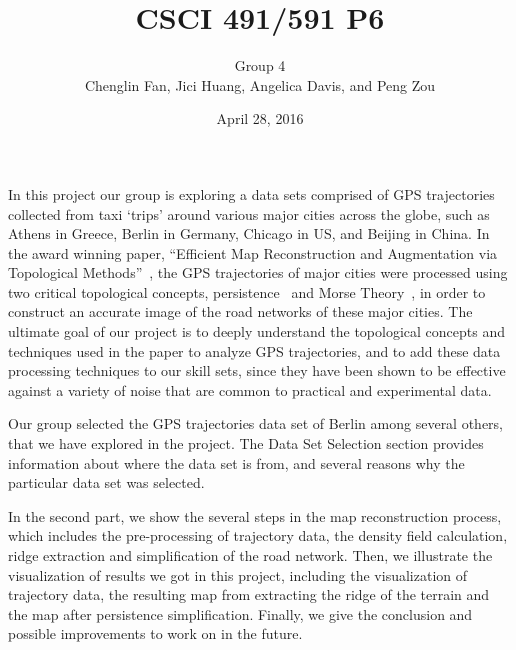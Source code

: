 \documentclass[11pt]{article}
\title{CSCI 491/591 P6}
\date{April 28, 2016}
\author{Group 4\\Chenglin Fan, Jici Huang,
Angelica Davis, and Peng Zou}
\begin{document}
\maketitle
\vspace{-0.4 in}
\noindent


  In this project our group is exploring a data sets comprised of GPS trajectories collected from taxi `trips' around various major cities across the globe, such as Athens in Greece, Berlin in Germany, Chicago in US, and Beijing in China. In the award winning paper, ``Efficient Map Reconstruction and Augmentation via Topological Methods''~\cite{Wang15}, the GPS trajectories of major cities were processed using two critical topological concepts, persistence~\cite{edelsbrunner2008persistent} and Morse Theory~\cite{milnor1963morse}, in order to construct an accurate image of the road networks of these major cities. The ultimate goal of our project is to deeply understand the topological concepts and techniques used in the paper to analyze GPS trajectories, and to add these data processing techniques to our skill sets, since they have been shown to be effective against a variety of noise that are common to  practical and experimental data.
  \par Our group selected the GPS trajectories data set of Berlin among several others, that we have explored in the project. The Data Set Selection section provides information about where the data set is from, and several reasons why the particular data set was selected. 
  
  
In the second part, we show the  several steps in the map reconstruction process, which includes the pre-processing of trajectory data, the density field calculation, ridge extraction and  simplification of the road network.
Then, we illustrate the visualization of results we got in this project, including the visualization of trajectory data, the resulting map from extracting the ridge of the terrain and the map after persistence simplification.
Finally, we give the conclusion and possible improvements to work on in the future.
\end{document}
